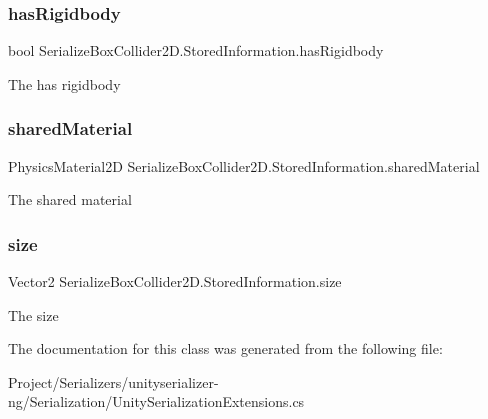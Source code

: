 \subsubsection{\texorpdfstring{has\+Rigidbody}{hasRigidbody}}
{\footnotesize\ttfamily bool Serialize\+Box\+Collider2\+D.\+Stored\+Information.\+has\+Rigidbody}



The has rigidbody 

\mbox{\label{class_serialize_box_collider2_d_1_1_stored_information_a00065b4309a794e0b8dfd50e582dbf37}} 
\subsubsection{\texorpdfstring{shared\+Material}{sharedMaterial}}
{\footnotesize\ttfamily Physics\+Material2D Serialize\+Box\+Collider2\+D.\+Stored\+Information.\+shared\+Material}



The shared material 

\mbox{\label{class_serialize_box_collider2_d_1_1_stored_information_a463e3c144b1d0aaffc9e891628c41e87}} 
\subsubsection{\texorpdfstring{size}{size}}
{\footnotesize\ttfamily Vector2 Serialize\+Box\+Collider2\+D.\+Stored\+Information.\+size}



The size 



The documentation for this class was generated from the following file\+:\begin{DoxyCompactItemize}
\item 
Project/\+Serializers/unityserializer-\/ng/\+Serialization/Unity\+Serialization\+Extensions.\+cs\end{DoxyCompactItemize}
